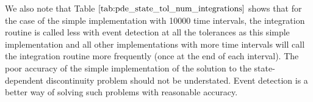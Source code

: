 \documentclass{article}
\begin{document}
We also note that Table $\ref{tab:pde_state_tol_num_integrations}$ shows that for the case of the simple implementation with 10000 time intervals, the integration routine is called less with event detection at all the tolerances as this simple implementation and all other implementations with more time intervals will call the integration routine more frequently (once at the end of each interval). The poor accuracy of the simple implementation of the solution to the state-dependent discontinuity problem should not be understated. Event detection is a better way of solving such problems with reasonable accuracy. 
\end{document}
